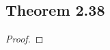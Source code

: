 \documentclass[../../main.tex]{subfiles}
\begin{document}
\subsection{Theorem 2.38}
\begin{wts}

\end{wts}
\begin{proof}

\end{proof}
\end{document}
